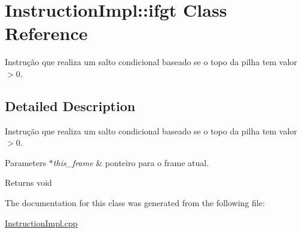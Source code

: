 \hypertarget{class_instruction_impl_1_1ifgt}{}\section{Instruction\+Impl\+:\+:ifgt Class Reference}
\label{class_instruction_impl_1_1ifgt}


Instrução que realiza um salto condicional baseado se o topo da pilha tem valor $>$0.  




\subsection{Detailed Description}
Instrução que realiza um salto condicional baseado se o topo da pilha tem valor $>$0. 


\begin{DoxyParams}{Parameters}
{\em $\ast$this\+\_\+frame} & ponteiro para o frame atual. \\
\hline
\end{DoxyParams}
\begin{DoxyReturn}{Returns}
void 
\end{DoxyReturn}


The documentation for this class was generated from the following file\+:\begin{DoxyCompactItemize}
\item 
\hyperlink{_instruction_impl_8cpp}{Instruction\+Impl.\+cpp}\end{DoxyCompactItemize}
